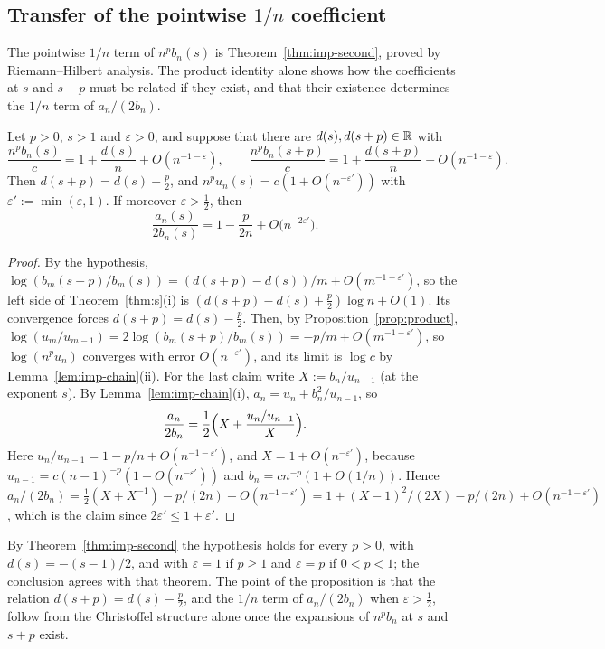 \subsection{Transfer of the pointwise \texorpdfstring{$1/n$}{1/n} coefficient}
The pointwise $1/n$ term of $n^pb_n(s)$ is Theorem~\ref{thm:imp-second}, proved by Riemann--Hilbert analysis. The
product identity alone shows how the coefficients at $s$ and $s+p$ must be related if they exist, and that their
existence determines the $1/n$ term of $a_n/(2b_n)$.

\begin{proposition}\label{prop:transfer}
Let $p>0$, $s>1$ and $\varepsilon>0$, and suppose that there are $d(s),d(s+p)\in\mathbb{R}$ with
\[
  \frac{n^pb_n(s)}{c}=1+\frac{d(s)}n+O(n^{-1-\varepsilon}),\qquad
  \frac{n^pb_n(s+p)}{c}=1+\frac{d(s+p)}n+O(n^{-1-\varepsilon}).
\]
Then $d(s+p)=d(s)-\frac p2$, and $n^pu_n(s)=c(1+O(n^{-\varepsilon'}))$ with $\varepsilon':=\min(\varepsilon,1)$. If moreover
$\varepsilon>\frac12$, then
\[
  \frac{a_n(s)}{2b_n(s)}=1-\frac p{2n}+O\bigl(n^{-2\varepsilon'}\bigr).
\]
\end{proposition}

\begin{proof}
By the hypothesis, $\log(b_m(s+p)/b_m(s))=(d(s+p)-d(s))/m+O(m^{-1-\varepsilon'})$, so the left side of
Theorem~\ref{thm:s}(i) is $(d(s+p)-d(s)+\frac p2)\log n+O(1)$. Its convergence forces $d(s+p)=d(s)-\frac p2$. Then,
by Proposition~\ref{prop:product}, $\log(u_m/u_{m-1})=2\log(b_m(s+p)/b_m(s))=-p/m+O(m^{-1-\varepsilon'})$, so
$\log(n^pu_n)$ converges with error $O(n^{-\varepsilon'})$, and its limit is $\log c$ by Lemma~\ref{lem:imp-chain}(ii).
For the last claim write $X:=b_n/u_{n-1}$ (at the exponent $s$). By Lemma~\ref{lem:imp-chain}(i),
$a_n=u_n+b_n^2/u_{n-1}$, so
\[
  \frac{a_n}{2b_n}=\frac12\Bigl(X+\frac{u_n/u_{n-1}}X\Bigr).
\]
Here $u_n/u_{n-1}=1-p/n+O(n^{-1-\varepsilon'})$, and $X=1+O(n^{-\varepsilon'})$, because
$u_{n-1}=c(n-1)^{-p}(1+O(n^{-\varepsilon'}))$ and $b_n=cn^{-p}(1+O(1/n))$. Hence
$a_n/(2b_n)=\frac12(X+X^{-1})-p/(2n)+O(n^{-1-\varepsilon'})=1+(X-1)^2/(2X)-p/(2n)+O(n^{-1-\varepsilon'})$, which is the
claim since $2\varepsilon'\le1+\varepsilon'$.
\end{proof}

By Theorem~\ref{thm:imp-second} the hypothesis holds for every $p>0$, with $d(s)=-(s-1)/2$, and with $\varepsilon=1$
if $p\ge1$ and $\varepsilon=p$ if $0<p<1$; the conclusion agrees with that theorem. The point of the proposition is
that the relation $d(s+p)=d(s)-\frac p2$, and the $1/n$ term of $a_n/(2b_n)$ when $\varepsilon>\frac12$, follow from
the Christoffel structure alone once the expansions of $n^pb_n$ at $s$ and $s+p$ exist.

